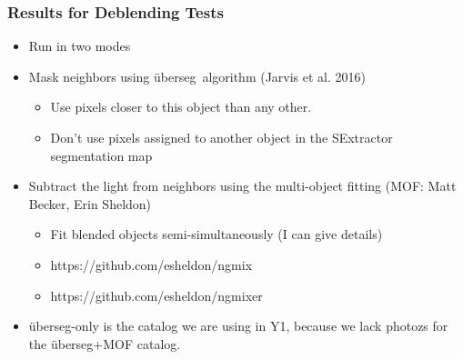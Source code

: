 \documentclass{beamer}
\newcommand{\uberseg}{{\"u}berseg}
\begin{document}
\frame
{

    \frametitle{Results for Deblending Tests}



    \begin{itemize}

        \item Run in two modes
        \item Mask neighbors using \uberseg\ algorithm (Jarvis et al. 2016)
            \begin{itemize}
                \item Use pixels closer to this object than any other.
                \item Don't use pixels assigned to another
                    object in the SExtractor segmentation map
            \end{itemize}

        \item Subtract the light from neighbors using the multi-object
            fitting (MOF: Matt Becker, Erin Sheldon)
            \begin{itemize}
                \item Fit blended objects semi-simultaneously (I can give details)
                \item https://github.com/esheldon/ngmix
                \item https://github.com/esheldon/ngmixer
            \end{itemize}

        \item \uberseg-only is the catalog we are using in Y1, because we
            lack photozs for the \uberseg+MOF catalog.

    \end{itemize}


}
\end{document}
